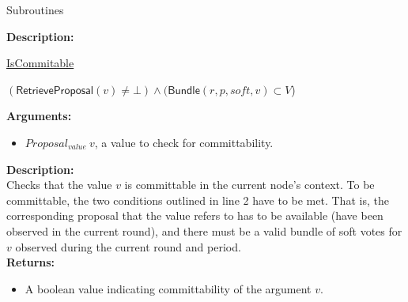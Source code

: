 \documentclass[10pt,a4paper]{article}
\begin{document}
\begin{section}{Subroutines}
\begin{algorithm}[H]
\begin{algorithmic}[1]



    \EndFunction
    \end{algorithmic}
\end{algorithm}

\noindent \textbf{Description:}\\


\begin{algorithm}[H]
    \caption{\underline{IsCommitable}}
    \label{algo:is-commitable}
    \begin{algorithmic}[1]

    \State \Return $(\mathsf{RetrieveProposal}(v) \neq \bot) \land (\mathsf{Bundle}(r,p,soft,v) \subset V$)

    \EndFunction
    \end{algorithmic}
\end{algorithm}


\noindent \textbf{Arguments:}
\begin{itemize}
    \item $Proposal_{value} \ v$, a value to check for committability.
  \end{itemize}

\noindent \textbf{Description:}\\
Checks that the value $v$ is committable in the current node's context.
To be committable, the two conditions outlined in line 2 have to be met.
That is, the corresponding proposal that the value refers to has to be
available (have been observed in the current round), and there must
be a valid bundle of soft votes for $v$ observed during the current round and
period. \\

\noindent \textbf{Returns:}
\begin{itemize}
    \item A boolean value indicating committability of the argument $v$.
  \end{itemize}


\begin{algorithm}[H]
    \begin{algorithmic}[1]


\end{algorithmic}
\end{algorithm}
\end{section}
\end{document}
